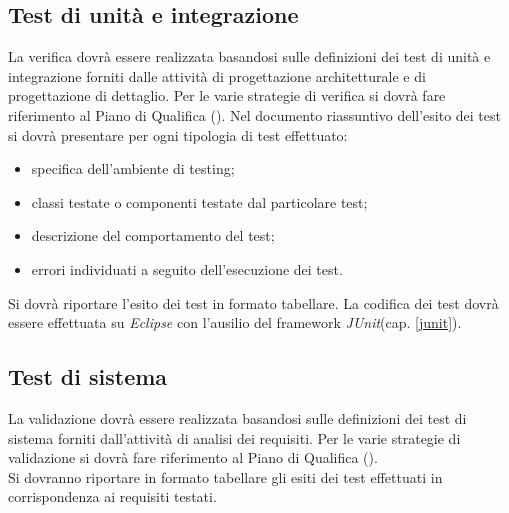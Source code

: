 \subsection{Test di unità e integrazione}
La verifica dovrà essere realizzata basandosi sulle definizioni dei test di unità e integrazione forniti dalle attività di progettazione architetturale e di progettazione di dettaglio. Per le varie strategie di verifica si dovrà fare riferimento al Piano di Qualifica (\textit{\PianoDiQualifica}).
\newline
Nel documento riassuntivo dell'esito dei test si dovrà presentare per ogni tipologia di test effettuato:
\begin{itemize}
\item specifica dell'ambiente di testing;
\item classi testate o componenti testate dal particolare test;
\item descrizione del comportamento del test;
\item errori individuati a seguito dell'esecuzione dei test.
\end{itemize}
Si dovrà riportare l'esito dei test in formato tabellare.
\newline
La codifica dei test dovrà essere effettuata su \textit{Eclipse} con l'ausilio del framework \textit{JUnit}(cap. \ref{junit}).



\subsection{Test di sistema}
La validazione dovrà essere realizzata basandosi sulle definizioni dei test di sistema forniti dall'attività di analisi dei requisiti. Per le varie strategie di validazione si dovrà fare riferimento al Piano di Qualifica (\textit{\PianoDiQualifica}).\\
Si dovranno riportare in formato tabellare gli esiti dei test effettuati in corrispondenza ai requisiti testati.